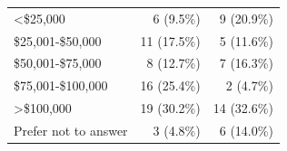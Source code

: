 \documentclass[
  doc]{apa6}
\begin{document}
\begin{table}[!h]
\begin{tabular}[t]{lrr}
\hspace{1em}<\$25,000 & 6 (9.5\%) & 9 (20.9\%)\\
\hspace{1em}\$25,001-\$50,000 & 11 (17.5\%) & 5 (11.6\%)\\
\hspace{1em}\$50,001-\$75,000 & 8 (12.7\%) & 7 (16.3\%)\\
\hspace{1em}\$75,001-\$100,000 & 16 (25.4\%) & 2 (4.7\%)\\
\hspace{1em}>\$100,000 & 19 (30.2\%) & 14 (32.6\%)\\
\hspace{1em}Prefer not to answer & 3 (4.8\%) & 6 (14.0\%)\\
\bottomrule
\end{tabular}
\end{table}
\end{document}
